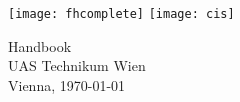 %
%

\begin{titlepage}
\begin{center}

\vfill \texttt{[image: fhcomplete]}
\vspace*{20mm}
\vfill \texttt{[image: cis]}
\vspace*{10mm} 

\huge Handbook\\

	
\large \vfill UAS Technikum Wien\\

Vienna, \today
\end{center}
\end{titlepage}